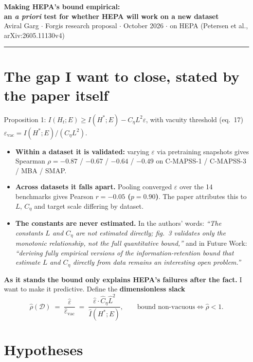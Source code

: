\documentclass[9pt]{extarticle}
\newcommand{\hl}[1]{\textcolor{acc}{\textbf{#1}}}
\newcommand{\B}[1]{\textbf{#1}}
\begin{document}
{\large\bfseries Making HEPA's bound empirical:}\\[1pt]
{\large\bfseries an \emph{a priori} test for whether HEPA will work on a new dataset}\\[2pt]
{\footnotesize Aviral Garg \;$\cdot$\; Forgis research proposal \;$\cdot$ October 2026 \;$\cdot$\;
on HEPA (Petersen et al., arXiv:2605.11130v4)}
\vspace{2pt}\hrule\vspace{3pt}

\section{The gap I want to close, stated by the paper itself}

Proposition 1: $I(H_t;E) \ge I(H^*;E) - C_\eta L^2 \varepsilon$, with vacuity threshold (eq.~17)
$\varepsilon_{\text{vac}} = I(H^*;E)/(C_\eta L^2)$.

\begin{itemize}
\item \B{Within a dataset it is validated:} varying $\varepsilon$ via pretraining snapshots gives Spearman
      $\rho = -0.87$ / $-0.67$ / $-0.64$ / $-0.49$ on C-MAPSS-1 / C-MAPSS-3 / MBA / SMAP.
\item \B{Across datasets it falls apart.} Pooling converged $\varepsilon$ over the 14 benchmarks gives Pearson
      \hl{$r = -0.05$ ($p=0.90$)}. The paper attributes this to $L$, $C_\eta$ and target scale differing by dataset.
\item \B{The constants are never estimated.} In the authors' words: \emph{``The constants $L$ and $C_\eta$ are not
      estimated directly; fig.~3 validates only the monotonic relationship, not the full quantitative bound,''}
      and in Future Work: \emph{``deriving fully empirical versions of the information-retention bound that
      estimate $L$ and $C_\eta$ directly from data remains an interesting open problem.''}
\end{itemize}

\hl{As it stands the bound only explains HEPA's failures after the fact.} I want to make it predictive.
Define the \B{dimensionless slack}
\[
\hat\rho(\mathcal{D}) \;=\; \frac{\hat\varepsilon}{\hat\varepsilon_{\text{vac}}}
\;=\; \frac{\hat\varepsilon \cdot \hat C_\eta \hat L^2}{\hat I(H^*;E)} ,
\qquad\text{bound non-vacuous}\iff \hat\rho < 1 .
\]

\section{Hypotheses}
\end{document}
